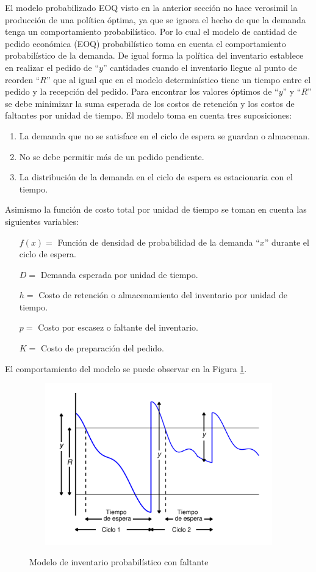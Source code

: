 El modelo probabilizado EOQ visto en la anterior sección no hace verosimil la producción de una política óptima, ya que se ignora el hecho de que la demanda tenga un comportamiento probabilístico. Por lo cual el modelo de cantidad de pedido económica (EOQ) probabilístico toma en cuenta el comportamiento probabilístico de la demanda. De igual forma la política del inventario establece en realizar el pedido de ``$y$'' cantidades cuando el inventario llegue al punto de reorden ``$R$'' que al igual que en el modelo determinístico tiene un tiempo entre el pedido y la recepción del pedido. Para encontrar los valores óptimos de ``$y$'' y ``$R$'' se debe minimizar la suma esperada de los costos de retención y los costos de faltantes por unidad de tiempo. El modelo toma en cuenta tres suposiciones:
\begin{enumerate}
	\item La demanda que no se satisface en el ciclo de espera se guardan o almacenan.
	\item No se debe permitir más de un pedido pendiente.
	\item La distribución de la demanda en el ciclo de espera es estacionaria con el tiempo.
\end{enumerate}
Asimismo la función de costo total por unidad de tiempo se toman en cuenta las siguientes variables:
\begin{itemize}
	\item[$f(x) =$] Función de densidad de probabilidad de la demanda ``$x$'' durante el ciclo de espera.
	\item[$D =$] Demanda esperada por unidad de tiempo.
	\item[$h =$] Costo de retención o almacenamiento del inventario por unidad de tiempo.
	\item[$p =$] Costo por escasez o faltante del inventario.
	\item[$K =$] Costo de preparación del pedido.
\end{itemize}
El comportamiento del modelo se puede observar en la Figura \ref{fig:img11}.
\begin{figure}[h!]
  \caption{Modelo de inventario probabilístico con faltante}
  {\includegraphics[width=15cm, height=7cm]{images/img11.pdf}}
  \label{fig:img11}
\end{figure} 
